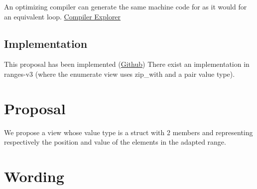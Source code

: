 \documentclass{wg21}
\begin{document}
An optimizing compiler can generate the same machine code for  as it would for an equivalent  loop.  \href{https://godbolt.org/z/2Kxo8d}{Compiler Explorer}


\subsection{Implementation}

This proposal has been implemented (\href{https://github.com/cor3ntin/rangesnext/blob/master/include/cor3ntin/rangesnext/enumerate.hpp}{Github})
There exist an implementation in ranges-v3 (where the enumerate view uses zip_with and a pair value type).

\section{Proposal}

We propose a view  whose value type is a struct with 2 members  and 
representing respectively the position and value of the elements in the adapted range. 

\section{Wording}
\end{document}
